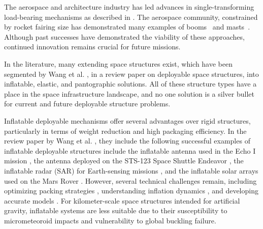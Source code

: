 The aerospace and architecture industry has led advances in single-transforming load-bearing mechanisms as described in \cite{doi:10.1177/0266351117711290}. The aerospace community, constrained by rocket fairing size has demonstrated many examples of booms~\cite{chu_design_2014,fernandez_advanced_2017,noauthor_lightweight_2004,you_self-locking_2006,yang_wrapping_2019,yang_novel_2022,wang_blossoming_2020,shore_effects_2021,salazar_experimental_2021} and masts~\cite{brown_deployable_2011,harrison_nuclear_2013,li_deployment_2016,nagaraj_kinematics_2009, tibert_deployable_nodate,you_cable-stiffened_1996,yu_nonlinear_2021}. Although past successes have demonstrated the viability of these approaches, continued innovation remains crucial for future missions. 

{In the literature, many extending space structures exist, which have been segmented by Wang et al. \cite{WANG2024112557}, in a review paper on deployable space structures, into inflatable, elastic, and pantographic solutions. All of these structure types have a place in the space infrastructure landscape, and no one solution is a silver bullet for current and future deployable structure problems.} 

{Inflatable deployable mechanisms offer several advantages over rigid structures, particularly in terms of weight reduction and high packaging efficiency. In the review paper by Wang et al. \cite{WANG2024112557}, they include the following successful examples of inflatable deployable structures include the inflatable antenna used in the Echo I mission \cite{grahne2001deployment}, the antenna deployed on the STS-123 Space Shuttle Endeavor \cite{cooper2009rigidizable}, the inflatable radar (SAR) for Earth-sensing missions \cite{lou2000development}, and the inflatable solar arrays used on the Mars Rover \cite{cadogan1999inflatable}. However, several technical challenges remain, including optimizing packing strategies \cite{schenk2014review}, understanding inflation dynamics \cite{cui2012overview}, and developing accurate models \cite{dollah2017inflatable}. For kilometer-scale space structures intended for artificial gravity, inflatable systems are less suitable due to their susceptibility to micrometeoroid impacts and vulnerability to global buckling failure.}

